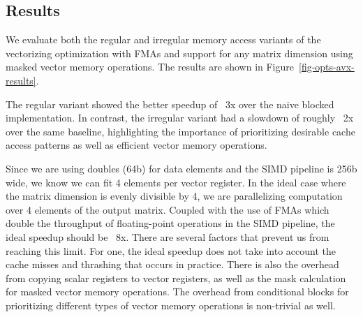 \subsection{Results}


We evaluate both the regular and irregular memory access variants of the
vectorizing optimization with FMAs and support for any matrix dimension
using masked vector memory operations. The results are shown in
Figure~\ref{fig-opts-avx-results}.
\smallskip

The regular variant showed the better speedup of ~3x over the naive
blocked implementation. In contrast, the irregular variant had a slowdown
of roughly ~2x over the same baseline, highlighting the importance of
prioritizing desirable cache access patterns as well as efficient vector
memory operations.
\smallskip

Since we are using doubles (64b) for data elements and the SIMD pipeline
is 256b wide, we know we can fit 4 elements per vector register. In the
ideal case where the matrix dimension is evenly divisible by 4, we are
parallelizing computation over 4 elements of the output matrix. Coupled
with the use of FMAs which double the throughput of floating-point
operations in the SIMD pipeline, the ideal speedup should be ~8x. There
are several factors that prevent us from reaching this limit. For one,
the ideal speedup does not take into account the cache misses and
thrashing that occurs in practice. There is also the overhead from
copying scalar registers to vector registers, as well as the mask
calculation for masked vector memory operations. The overhead from
conditional blocks for prioritizing different types of vector memory
operations is non-trivial as well.

\clearpage
